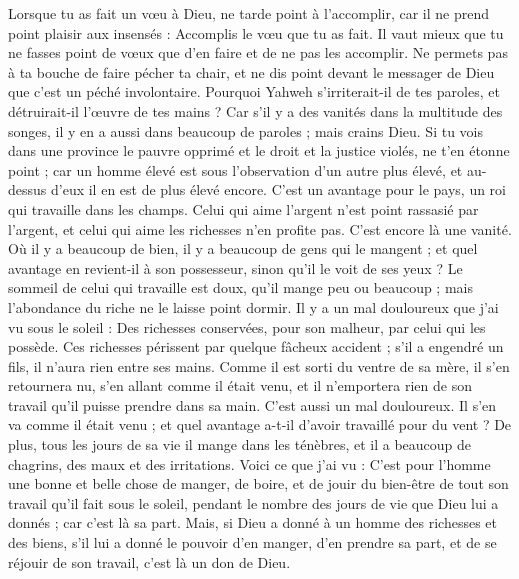 \begin{multicols}{2}
Lorsque tu as fait un vœu à Dieu, ne tarde point à l'accomplir, car il ne prend point plaisir aux insensés : Accomplis le vœu que tu as fait.
Il vaut mieux que tu ne fasses point de vœux que d'en faire et de ne pas les accomplir.
Ne permets pas à ta bouche de faire pécher ta chair, et ne dis point devant le messager de Dieu que c'est un péché involontaire. Pourquoi Yahweh s’irriterait-il de tes paroles, et détruirait-il l'œuvre de tes mains ?
Car s’il y a des vanités dans la multitude des songes, il y en a aussi dans beaucoup de paroles ; mais crains Dieu.
Si tu vois dans une province le pauvre opprimé et le droit et la justice violés, ne t’en étonne point ; car un homme élevé est sous l'observation d’un autre plus élevé, et au-dessus d’eux il en est de plus élevé encore.
C’est un avantage pour le pays, un roi qui travaille dans les champs.
Celui qui aime l'argent n'est point rassasié par l'argent, et celui qui aime les richesses n’en profite pas. C’est encore là une vanité.
Où il y a beaucoup de bien, il y a beaucoup de gens qui le mangent ; et quel avantage en revient-il à son possesseur, sinon qu'il le voit de ses yeux ?
Le sommeil de celui qui travaille est doux, qu'il mange peu ou beaucoup ; mais l’abondance du riche ne le laisse point dormir.
Il y a un mal douloureux que j'ai vu sous le soleil : Des richesses conservées, pour son malheur, par celui qui les possède.
Ces richesses périssent par quelque fâcheux accident ; s’il a engendré un fils, il n'aura rien entre ses mains.
Comme il est sorti du ventre de sa mère, il s'en retournera nu, s'en allant comme il était venu, et il n'emportera rien de son travail qu’il puisse prendre dans sa main.
C'est aussi un mal douloureux. Il s’en va comme il était venu ; et quel avantage a-t-il d'avoir travaillé pour du vent ?
De plus, tous les jours de sa vie il mange dans les ténèbres, et il a beaucoup de chagrins, des maux et des irritations.
Voici ce que j'ai vu : C'est pour l’homme une bonne et belle chose de manger, de boire, et de jouir du bien-être de tout son travail qu'il fait sous le soleil, pendant le nombre des jours de vie que Dieu lui a donnés ; car c'est là sa part.
Mais, si Dieu a donné à un homme des richesses et des biens, s’il lui a donné le pouvoir d’en manger, d’en prendre sa part, et de se réjouir de son travail, c'est là un don de Dieu.

\end{multicols}
